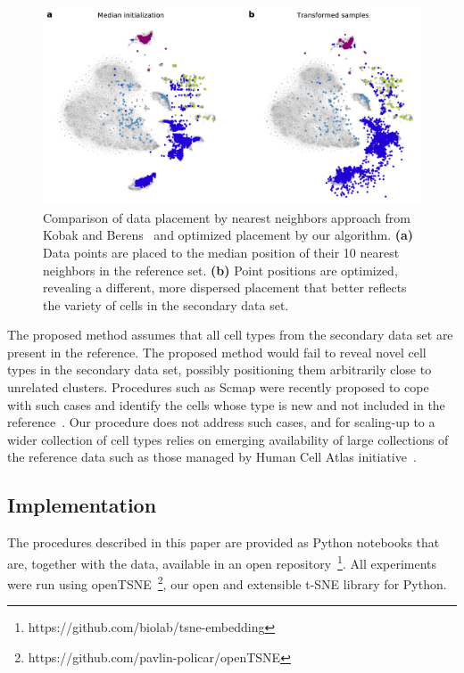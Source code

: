 \documentclass[runningheads]{llncs}
\begin{document}
\begin{figure}[htbp]
\includegraphics[width=\textwidth]{figures/optimization_retina.pdf}
\caption{Comparison of data placement by nearest neighbors approach from Kobak
and Berens~\cite{art_of_using_tsne} and optimized placement by our algorithm.
{\bf (a)} Data points are placed to the median position of their 10 nearest
neighbors in the reference set. {\bf (b)} Point positions are optimized,
revealing a different, more dispersed placement that better reflects the
variety of cells in the secondary data set.}
\label{fig:optimization}
\end{figure}

The proposed method assumes that all cell types from the secondary data set are
present in the reference. The proposed method would fail to reveal novel cell
types in the secondary data set, possibly positioning them arbitrarily close to
unrelated clusters. Procedures such as Scmap were recently
proposed to cope with such cases and identify the cells whose type is new and
not included in the reference~\cite{scmap}. Our procedure does not address such cases, and
for scaling-up to a wider collection of cell types relies on emerging
availability of large collections of the reference data such as those managed
by Human Cell Atlas initiative~\cite{hca}. 

\subsection{Implementation\label{sec:implementation}}

The procedures described in this paper are provided as Python notebooks that
are, together with the data, available in an open
repository~\footnote{https://github.com/biolab/tsne-embedding}. All experiments
were run using openTSNE~\footnote{https://github.com/pavlin-policar/openTSNE},
our open and extensible t-SNE library for Python.
\end{document}
